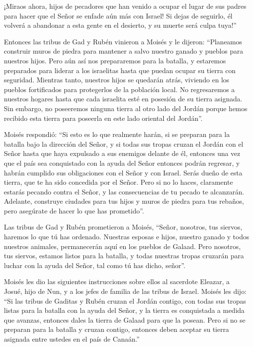  ¡Miraos ahora, hijos de pecadores que han venido a ocupar
el lugar de sus padres para hacer que el Señor se enfade aún más con
Israel!  Si dejas de seguirlo, él volverá a abandonar a
esta gente en el desierto, y su muerte será culpa tuya!''

 Entonces las tribus de Gad y Rubén vinieron a Moisés y le
dijeron: ``Planeamos construir muros de piedra para mantener a salvo
nuestro ganado y pueblos para nuestros hijos.  Pero aún así
nos prepararemos para la batalla, y estaremos preparados para liderar a
los israelitas hasta que puedan ocupar su tierra con seguridad. Mientras
tanto, nuestros hijos se quedarán atrás, viviendo en los pueblos
fortificados para protegerlos de la población local.  No
regresaremos a nuestros hogares hasta que cada israelita esté en
posesión de su tierra asignada.  Sin embargo, no poseeremos
ninguna tierra al otro lado del Jordán porque hemos recibido esta tierra
para poseerla en este lado oriental del Jordán''.

 Moisés respondió: ``Si esto es lo que realmente harán, si
se preparan para la batalla bajo la dirección del Señor,  y
si todas sus tropas cruzan el Jordán con el Señor hasta que haya
expulsado a sus enemigos delante de él,  entonces una vez
que el país sea conquistado con la ayuda del Señor entonces podrán
regresar, y habrán cumplido sus obligaciones con el Señor y con Israel.
Serás dueño de esta tierra, que te ha sido concedida por el Señor.
 Pero si no lo haces, claramente estarás pecando contra el
Señor, y las consecuencias de tu pecado te alcanzarán. 
Adelante, construye ciudades para tus hijos y muros de piedra para tus
rebaños, pero asegúrate de hacer lo que has prometido''.

 Las tribus de Gad y Rubén prometieron a Moisés, ``Señor,
nosotros, tus siervos, haremos lo que tú has ordenado. 
Nuestras esposas e hijos, nuestro ganado y todos nuestros animales,
permanecerán aquí en los pueblos de Galaad.  Pero nosotros,
tus siervos, estamos listos para la batalla, y todas nuestras tropas
cruzarán para luchar con la ayuda del Señor, tal como tú has dicho,
señor''.

 Moisés les dio las siguientes instrucciones sobre ellos al
sacerdote Eleazar, a Josué, hijo de Nun, y a los jefes de familia de las
tribus de Israel.  Moisés les dijo: ``Si las tribus de
Gaditas y Rubén cruzan el Jordán contigo, con todas sus tropas listas
para la batalla con la ayuda del Señor, y la tierra es conquistada a
medida que avanzas, entonces dales la tierra de Galaad para que la
posean.  Pero si no se preparan para la batalla y cruzan
contigo, entonces deben aceptar su tierra asignada entre ustedes en el
país de Canaán.''

